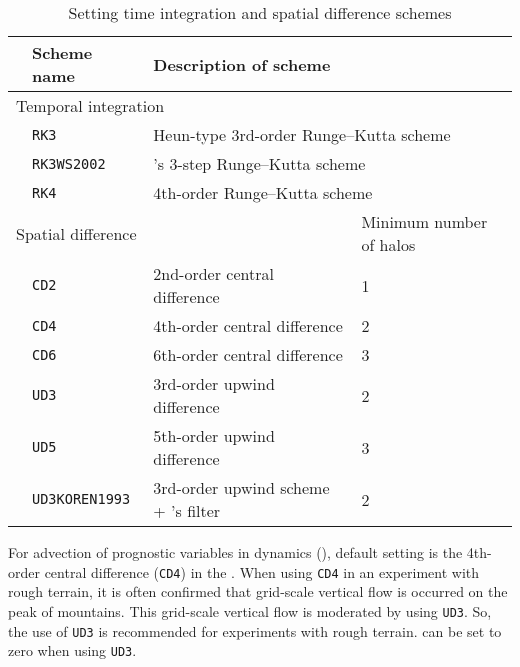 \begin{table}[bth]
\begin{center}
  \caption{Setting time integration and spatial difference schemes}
  \label{tab:nml_atm_dyn}
  \begin{tabularx}{150mm}{llXX} \hline
    \rowcolor[gray]{0.9} & \multicolumn{1}{l}{Scheme name} & \multicolumn{1}{l}{Description of scheme} & \\ \hline
    \multicolumn{3}{l}{Temporal integration} &  \\ \hline
    & \multicolumn{1}{l}{\verb|RK3|} & \multicolumn{2}{l}{Heun-type 3rd-order Runge--Kutta scheme} \\
    & \multicolumn{1}{l}{\verb|RK3WS2002|} & \multicolumn{2}{l}{\citet{Wicker_2002}'s 3-step Runge--Kutta scheme} \\
    & \multicolumn{1}{l}{\verb|RK4|} & \multicolumn{2}{l}{4th-order Runge--Kutta scheme} \\
    \hline
    \multicolumn{3}{l}{Spatial difference} & Minimum number of halos\\ \hline
    & \multicolumn{1}{l}{\verb|CD2|} & \multicolumn{1}{l}{2nd-order central difference} & \multicolumn{1}{l}{1}\\
    & \multicolumn{1}{l}{\verb|CD4|} & \multicolumn{1}{l}{4th-order central difference} & \multicolumn{1}{l}{2}\\
    & \multicolumn{1}{l}{\verb|CD6|} & \multicolumn{1}{l}{6th-order central difference} & \multicolumn{1}{l}{3}\\
    & \multicolumn{1}{l}{\verb|UD3|} & \multicolumn{1}{l}{3rd-order upwind difference} & \multicolumn{1}{l}{2}\\
    & \multicolumn{1}{l}{\verb|UD5|} & \multicolumn{1}{l}{5th-order upwind difference} & \multicolumn{1}{l}{3}\\
    & \multicolumn{1}{l}{\verb|UD3KOREN1993|} & \multicolumn{1}{X}{3rd-order upwind scheme + \citet{Koren_1993}'s filter} & \multicolumn{1}{l}{2}\\
\hline
  \end{tabularx}
\end{center}
\end{table}

For advection of prognostic variables in dynamics (), 
default setting is the 4th-order central difference (\verb|CD4|) in the \scalerm.
When using \verb|CD4| in an experiment with rough terrain,
it is often confirmed that grid-scale vertical flow is occurred on the peak of mountains.
This grid-scale vertical flow is moderated by using \verb|UD3|. 
So, the use of \verb|UD3| is recommended for experiments with rough terrain.
 can be set to zero when using \verb|UD3|.

